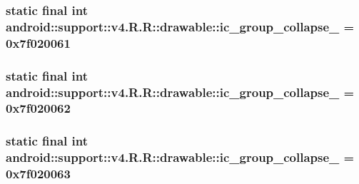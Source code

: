 \hypertarget{classandroid_1_1support_1_1v4_1_1_r_1_1drawable_3e4a478c4e5269deda6e80253c80e0a9}{
\subsubsection[{ic\_\-group\_\-collapse\_\-02}]{\setlength{\rightskip}{0pt plus 5cm}static final int android::support::v4.R.R::drawable::ic\_\-group\_\-collapse\_ = 0x7f020061}}
\label{classandroid_1_1support_1_1v4_1_1_r_1_1drawable_3e4a478c4e5269deda6e80253c80e0a9}


\hypertarget{classandroid_1_1support_1_1v4_1_1_r_1_1drawable_bd631c9a9d42fee799c18f02a1e5221c}{
\subsubsection[{ic\_\-group\_\-collapse\_\-03}]{\setlength{\rightskip}{0pt plus 5cm}static final int android::support::v4.R.R::drawable::ic\_\-group\_\-collapse\_ = 0x7f020062}}
\label{classandroid_1_1support_1_1v4_1_1_r_1_1drawable_bd631c9a9d42fee799c18f02a1e5221c}


\hypertarget{classandroid_1_1support_1_1v4_1_1_r_1_1drawable_87c8213ccb46d0ed150d8cea5a464a0a}{
\subsubsection[{ic\_\-group\_\-collapse\_\-04}]{\setlength{\rightskip}{0pt plus 5cm}static final int android::support::v4.R.R::drawable::ic\_\-group\_\-collapse\_ = 0x7f020063}}
\label{classandroid_1_1support_1_1v4_1_1_r_1_1drawable_87c8213ccb46d0ed150d8cea5a464a0a}



